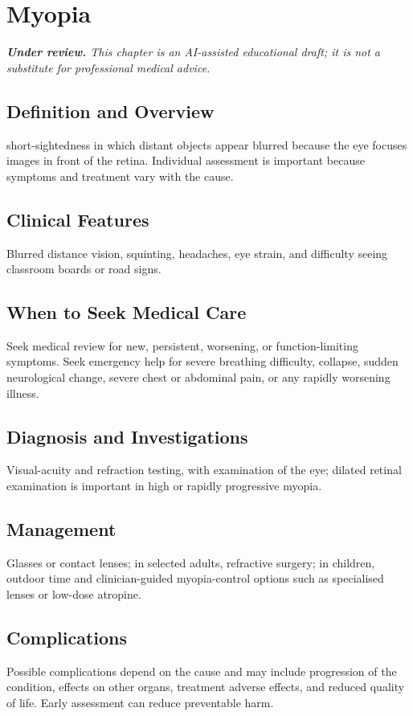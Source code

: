 \chapter{Myopia}

\medskip
\noindent\textit{\textbf{Under review.} This chapter is an AI-assisted educational draft; it is not a substitute for professional medical advice.}

\section*{Definition and Overview}
short-sightedness in which distant objects appear blurred because the eye focuses images in front of the retina. Individual assessment is important because symptoms and treatment vary with the cause.

\section*{Clinical Features}
Blurred distance vision, squinting, headaches, eye strain, and difficulty seeing classroom boards or road signs.

\section*{When to Seek Medical Care}
Seek medical review for new, persistent, worsening, or function-limiting symptoms. Seek emergency help for severe breathing difficulty, collapse, sudden neurological change, severe chest or abdominal pain, or any rapidly worsening illness.

\section*{Diagnosis and Investigations}
Visual-acuity and refraction testing, with examination of the eye; dilated retinal examination is important in high or rapidly progressive myopia.

\section*{Management}
Glasses or contact lenses; in selected adults, refractive surgery; in children, outdoor time and clinician-guided myopia-control options such as specialised lenses or low-dose atropine.

\section*{Complications}
Possible complications depend on the cause and may include progression of the condition, effects on other organs, treatment adverse effects, and reduced quality of life. Early assessment can reduce preventable harm.

